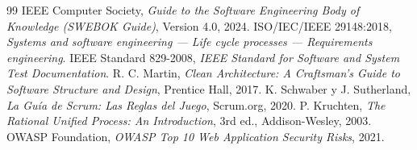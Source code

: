 \documentclass[11pt,a4paper,oneside]{report}
\begin{document}
\begin{thebibliography}{99}
 IEEE Computer Society, \textit{Guide to the Software Engineering Body of Knowledge (SWEBOK Guide)}, Version 4.0, 2024.
 ISO/IEC/IEEE 29148:2018, \textit{Systems and software engineering — Life cycle processes — Requirements engineering}.
 IEEE Standard 829-2008, \textit{IEEE Standard for Software and System Test Documentation}.
 R. C. Martin, \textit{Clean Architecture: A Craftsman's Guide to Software Structure and Design}, Prentice Hall, 2017.
 K. Schwaber y J. Sutherland, \textit{La Guía de Scrum: Las Reglas del Juego}, Scrum.org, 2020.
 P. Kruchten, \textit{The Rational Unified Process: An Introduction}, 3rd ed., Addison-Wesley, 2003.
 OWASP Foundation, \textit{OWASP Top 10 Web Application Security Risks}, 2021.
\end{thebibliography}
\end{document}
